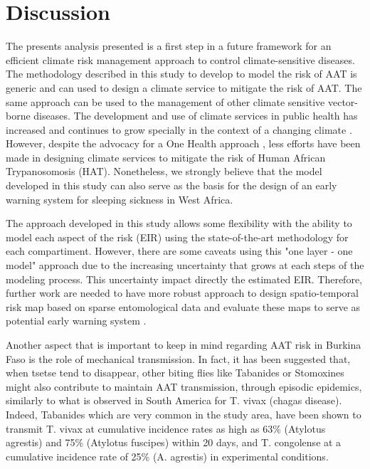 \documentclass[10pt]{article}
\begin{document}
\section*{Discussion}
\label{unnumbered-19}
The presents analysis presented is a first step in a future framework for
an efficient climate risk management approach to control climate-sensitive diseases.  
The methodology described in this study to develop to model the risk of AAT is generic and can used to design a  
climate service to mitigate the risk of AAT. The same approach can be used to the management of other climate sensitive vector-borne
diseases. The development and use of climate services in public health has increased and continues to grow specially in the context of a changing climate \cite{lowe2011spatio}.  
However, despite the advocacy for a One Health approach \cite{smith2014one, okello2014one}, less efforts have been made in designing climate services to mitigate the risk of Human African Trypanosomosis (HAT).
Nonetheless, we strongly believe that the model developed in this study can also serve as the basis for the design of an early warning system for sleeping sickness in West Africa.

\noindent
The approach developed in this study allows some flexibility with the ability to model
each aspect of the risk (EIR) using the state-of-the-art methodology for each compartiment. 
However, there are some caveats using this "one layer - one model" approach due to  
the increasing uncertainty that grows at each steps of the modeling process. 
This uncertainty impact directly the estimated EIR. Therefore, further work are needed to have more robust approach to design spatio-temporal risk
map based on sparse entomological data and evaluate these maps to serve as potential early warning system \cite{chaves2007comparing}.

\noindent
Another aspect that is important to keep in mind regarding AAT risk in Burkina Faso is the role of mechanical transmission. 
In fact, it has been suggested that, when tsetse tend to disappear, other biting flies like Tabanides or Stomoxines might also contribute to maintain AAT transmission, 
through episodic epidemics, similarly to what is observed in South America for T. vivax (chagas disease). 
Indeed, Tabanides which are very common in the study area, have been shown to transmit T. vivax at cumulative incidence rates as high as 63\% (Atylotus agrestis) and 75\% (Atylotus fuscipes) within 20 days, and T. congolense at a cumulative incidence rate of 25\% (A. agrestis) 
in experimental conditions. \cite{desquesnes2003mechanical}
\end{document}
